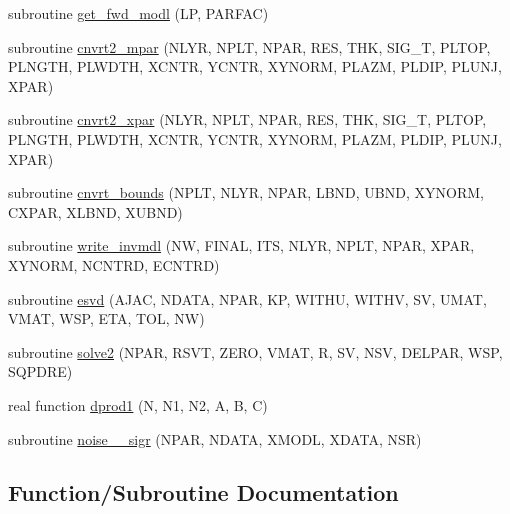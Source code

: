 \begin{DoxyCompactItemize}
\item 
subroutine \hyperlink{Leroi__c_8f90_a38a723748e0c805e5dfbd851b9c62b3e}{get\+\_\+fwd\+\_\+modl} (LP, P\+A\+R\+F\+AC)
\item 
subroutine \hyperlink{Leroi__c_8f90_a747a5bf7d69f6533bc2f54572584ba0c}{cnvrt2\+\_\+mpar} (N\+L\+YR, N\+P\+LT, N\+P\+AR, R\+ES, T\+HK, S\+I\+G\+\_\+T, P\+L\+T\+OP, P\+L\+N\+G\+TH, P\+L\+W\+D\+TH, X\+C\+N\+TR, Y\+C\+N\+TR, X\+Y\+N\+O\+RM, P\+L\+A\+ZM, P\+L\+D\+IP, P\+L\+U\+NJ, X\+P\+AR)
\item 
subroutine \hyperlink{Leroi__c_8f90_aa8246fcc58fb68567634de3315aa33d2}{cnvrt2\+\_\+xpar} (N\+L\+YR, N\+P\+LT, N\+P\+AR, R\+ES, T\+HK, S\+I\+G\+\_\+T, P\+L\+T\+OP, P\+L\+N\+G\+TH, P\+L\+W\+D\+TH, X\+C\+N\+TR, Y\+C\+N\+TR, X\+Y\+N\+O\+RM, P\+L\+A\+ZM, P\+L\+D\+IP, P\+L\+U\+NJ, X\+P\+AR)
\item 
subroutine \hyperlink{Leroi__c_8f90_a0801b4ca30057cb8ddfb94e49185a2ce}{cnvrt\+\_\+bounds} (N\+P\+LT, N\+L\+YR, N\+P\+AR, L\+B\+ND, U\+B\+ND, X\+Y\+N\+O\+RM, C\+X\+P\+AR, X\+L\+B\+ND, X\+U\+B\+ND)
\item 
subroutine \hyperlink{Leroi__c_8f90_a6e7ea94365af1aa0e4cf97b842e24cf6}{write\+\_\+invmdl} (NW, F\+I\+N\+AL, I\+TS, N\+L\+YR, N\+P\+LT, N\+P\+AR, X\+P\+AR, X\+Y\+N\+O\+RM, N\+C\+N\+T\+RD, E\+C\+N\+T\+RD)
\item 
subroutine \hyperlink{Leroi__c_8f90_a4ee1c663696c56423ddfdd31af7fbaa8}{esvd} (A\+J\+AC, N\+D\+A\+TA, N\+P\+AR, KP, W\+I\+T\+HU, W\+I\+T\+HV, SV, U\+M\+AT, V\+M\+AT, W\+SP, E\+TA, T\+OL, NW)
\item 
subroutine \hyperlink{Leroi__c_8f90_a044a67601ecbe84bae3971c52173d8c1}{solve2} (N\+P\+AR, R\+S\+VT, Z\+E\+RO, V\+M\+AT, R, SV, N\+SV, D\+E\+L\+P\+AR, W\+SP, S\+Q\+P\+D\+RE)
\item 
real function \hyperlink{Leroi__c_8f90_a728fa0fc652b63cee1eb0d408bbac553}{dprod1} (N, N1, N2, A, B, C)
\item 
subroutine \hyperlink{Leroi__c_8f90_aa11bf987208a116957b481b3765c8eaf}{noise\+\_\+\_\+sigr} (N\+P\+AR, N\+D\+A\+TA, X\+M\+O\+DL, X\+D\+A\+TA, N\+SR)
\end{DoxyCompactItemize}


\subsection{Function/\+Subroutine Documentation}
\mbox{\label{Leroi__c_8f90_a2d69cada9a1fff81caa02d919be5ce7c}} 

